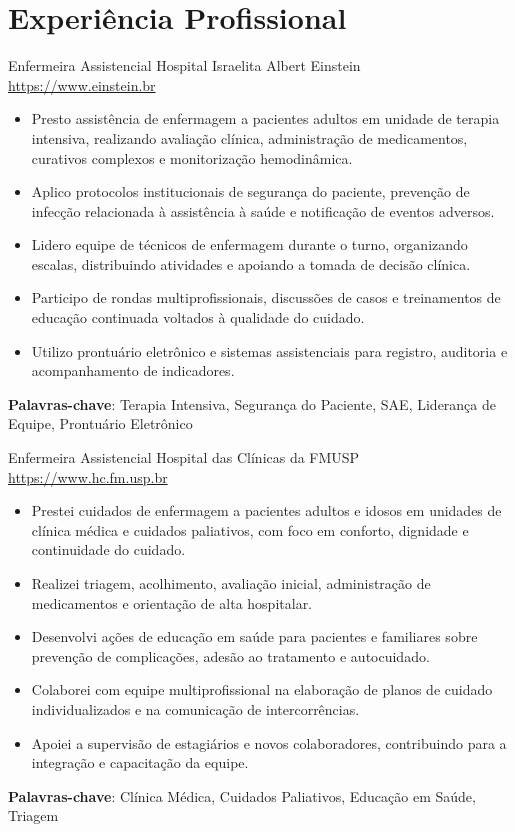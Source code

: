 \documentclass[a4paper, serif, 10pt]{moderncv}
\begin{document}
\section{Experiência Profissional}

        {Enfermeira Assistencial}
        {Hospital Israelita Albert Einstein}
        {\url{https://www.einstein.br}}
        {}
        {\begin{itemize}
\item Presto assistência de enfermagem a pacientes adultos em unidade de terapia intensiva, realizando avaliação clínica, administração de medicamentos, curativos complexos e monitorização hemodinâmica.
\item Aplico protocolos institucionais de segurança do paciente, prevenção de infecção relacionada à assistência à saúde e notificação de eventos adversos.
\item Lidero equipe de técnicos de enfermagem durante o turno, organizando escalas, distribuindo atividades e apoiando a tomada de decisão clínica.
\item Participo de rondas multiprofissionais, discussões de casos e treinamentos de educação continuada voltados à qualidade do cuidado.
\item Utilizo prontuário eletrônico e sistemas assistenciais para registro, auditoria e acompanhamento de indicadores.
\end{itemize}
\textbf{Palavras-chave}: Terapia Intensiva, Segurança do Paciente, SAE, Liderança de Equipe, Prontuário Eletrônico}

        {Enfermeira Assistencial}
        {Hospital das Clínicas da FMUSP}
        {\url{https://www.hc.fm.usp.br}}
        {}
        {\begin{itemize}
\item Prestei cuidados de enfermagem a pacientes adultos e idosos em unidades de clínica médica e cuidados paliativos, com foco em conforto, dignidade e continuidade do cuidado.
\item Realizei triagem, acolhimento, avaliação inicial, administração de medicamentos e orientação de alta hospitalar.
\item Desenvolvi ações de educação em saúde para pacientes e familiares sobre prevenção de complicações, adesão ao tratamento e autocuidado.
\item Colaborei com equipe multiprofissional na elaboração de planos de cuidado individualizados e na comunicação de intercorrências.
\item Apoiei a supervisão de estagiários e novos colaboradores, contribuindo para a integração e capacitação da equipe.
\end{itemize}
\textbf{Palavras-chave}: Clínica Médica, Cuidados Paliativos, Educação em Saúde, Triagem}
\end{document}
